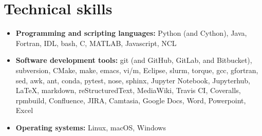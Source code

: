 \section{Technical skills}
\vspace{0.5em}

\begin{itemize}

  \item \textbf{Programming and scripting languages:}
    Python (and Cython), Java, Fortran, IDL, bash, C, MATLAB,
    Javascript, NCL

  \item \textbf{Software development tools:} git (and GitHub, GitLab,
    and Bitbucket), subversion, CMake, make, emacs, vi/m, Eclipse,
    slurm, torque, gcc, gfortran, sed, awk, ant, conda, pytest, nose,
    sphinx, Jupyter Notebook, Jupyterhub, \LaTeX, markdown,
    reStructuredText, MediaWiki, {Travis CI}, Coveralls, rpmbuild,
    Confluence, JIRA, Camtasia, Google Docs, Word, Powerpoint, Excel

  \item \textbf{Operating systems:}
    Linux, macOS, Windows

\end{itemize}
